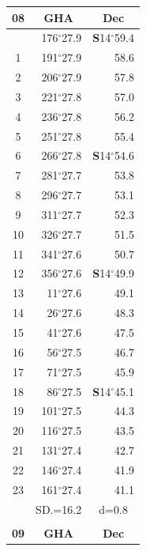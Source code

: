 \documentclass[10pt, a4paper]{report}
\begin{document}
\begin{scriptsize}
\begin{tabular*}{0.2\textwidth}[t]{@{\extracolsep{\fill}}|c|rr|}
\hline
\multicolumn{1}{|c|}{\rule{0pt}{2.6ex}\textbf{08}} & \multicolumn{1}{c}{\textbf{GHA}} & \multicolumn{1}{c|}{\textbf{Dec}}\\
\hline\rule{0pt}{2.6ex}\noindent
0 & 176$^\circ$27.9 & \textbf{S}14$^\circ$59.4\\
1 & 191$^\circ$27.9 & 58.6\\
2 & 206$^\circ$27.9 & 57.8\\
3 & 221$^\circ$27.8 & \raisebox{0.24ex}{\boldmath$\cdot$~\boldmath$\cdot$~~}57.0\\
4 & 236$^\circ$27.8 & 56.2\\
5 & 251$^\circ$27.8 & 55.4\\[2Pt]
6 & 266$^\circ$27.8 & \textbf{S}14$^\circ$54.6\\
7 & 281$^\circ$27.7 & 53.8\\
8 & 296$^\circ$27.7 & 53.1\\
9 & 311$^\circ$27.7 & \raisebox{0.24ex}{\boldmath$\cdot$~\boldmath$\cdot$~~}52.3\\
10 & 326$^\circ$27.7 & 51.5\\
11 & 341$^\circ$27.6 & 50.7\\[2Pt]
12 & 356$^\circ$27.6 & \textbf{S}14$^\circ$49.9\\
13 & 11$^\circ$27.6 & 49.1\\
14 & 26$^\circ$27.6 & 48.3\\
15 & 41$^\circ$27.6 & \raisebox{0.24ex}{\boldmath$\cdot$~\boldmath$\cdot$~~}47.5\\
16 & 56$^\circ$27.5 & 46.7\\
17 & 71$^\circ$27.5 & 45.9\\[2Pt]
18 & 86$^\circ$27.5 & \textbf{S}14$^\circ$45.1\\
19 & 101$^\circ$27.5 & 44.3\\
20 & 116$^\circ$27.5 & 43.5\\
21 & 131$^\circ$27.4 & \raisebox{0.24ex}{\boldmath$\cdot$~\boldmath$\cdot$~~}42.7\\
22 & 146$^\circ$27.4 & 41.9\\
23 & 161$^\circ$27.4 & 41.1\\
\hline
\rule{0pt}{2.4ex} & \multicolumn{1}{c}{SD.=16.2} & \multicolumn{1}{c|}{d=0.8}\\
\hline
\multicolumn{1}{c}{}\\[-0.5ex]\hline
\multicolumn{1}{|c|}{\rule{0pt}{2.6ex}\textbf{09}} & \multicolumn{1}{c}{\textbf{GHA}} & \multicolumn{1}{c|}{\textbf{Dec}}\\

\end{tabular*}
\end{scriptsize}
\end{document}
